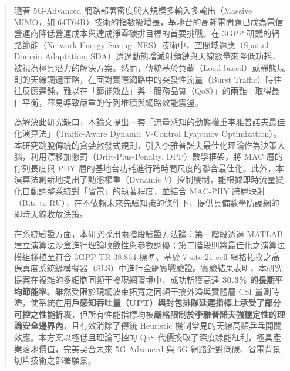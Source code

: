 
\begin{abstract}

隨著 5G-Advanced 網路部署密度與大規模多輸入多輸出（Massive MIMO，如 64T64R）技術的指數級增長，基地台的高耗電問題已成為電信營運商降低營運成本與達成淨零碳排目標的首要挑戰。在 3GPP 研議的網路節能（Network Energy Saving, NES）技術中，空間域適應（Spatial Domain Adaptation, SDA）透過動態增減射頻鏈與天線數量來降低功耗，被視為極具潛力的解決方案。然而，傳統基於負載（Load-based）或靜態規則的天線調適策略，在面對實際網路中的突發性流量（Burst Traffic）時往往反應遲鈍，難以在「節能效益」與「服務品質（QoS）」的兩難中取得最佳平衡，容易導致嚴重的佇列堆積與網路效能震盪。

為解決此研究缺口，本論文提出一套「流量感知的動態權重李雅普諾夫最佳化演算法」（Traffic-Aware Dynamic V-Control Lyapunov Optimization）。本研究跳脫傳統的貪婪啟發式規則，引入李雅普諾夫最佳化理論作為決策大腦，利用漂移加懲罰（Drift-Plus-Penalty, DPP）數學框架，將 MAC 層的佇列長度與 PHY 層的基地台功耗進行跨時間尺度的聯合最佳化。此外，本演算法創新地提出了動態權重（Dynamic $V$）控制機制，能根據即時流量變化自動調整系統對「省電」的執著程度，並結合 MAC-PHY 跨層映射（Bits to RU），在不依賴未來先驗知識的條件下，提供具備數學防護網的即時天線收放決策。

在系統驗證方面，本研究採用兩階段驗證方法論：第一階段透過 MATLAB 建立演算法沙盒進行理論收斂性與參數調優；第二階段則將最佳化之演算法模組移植至符合 3GPP TR 38.864 標準、基於 7-site 21-cell 網格拓撲之高保真度系統級模擬器（SLS）中進行全網實戰驗證。實驗結果表明，本研究提案在複雜的多細胞同頻干擾現網環境中，成功斬獲高達 \textbf{30.3\% 的長期平均節能率}。雖然受限於現網波束拓寬之同頻干擾外溢與實體層 CSI 量測時滯，使系統在\textbf{用戶感知吞吐量（UPT）與封包排隊延遲指標上承受了部分可控之性能折衷}，但所有性能指標均被\textbf{嚴格限制於李雅普諾夫強穩定性的理論安全邊界內}，且有效消除了傳統 Heuristic 機制常見的天線高頻乒乓開關效應。本方案以極低且理論可控的 QoS 代價換取了深度綠能紅利，極具產業落地價值，完美契合未來 5G-Advanced 與 6G 網路針對低碳、省電背景切片技術之部署願景。

\end{abstract}

\clearpage


